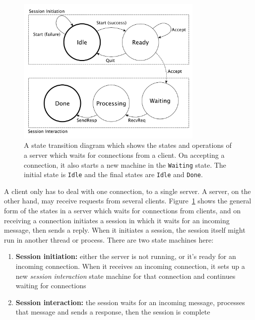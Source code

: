 \begin{figure}
\begin{center}
\includegraphics[width=9cm]{diagrams/randserver.pdf}
\end{center}
\caption{A state transition diagram which shows the states and
operations of a server which waits for connections from a client.
    On accepting a connection, it also starts a new machine in the \texttt{Waiting}
    state. The initial state is \texttt{Idle} and the final states are
    \texttt{Idle} and \texttt{Done}.}
\label{fig:randserver}
\end{figure}

A client only has to deal with one connection, to a single server. A server, on
the other hand, may receive requests from several clients. 
Figure~\ref{fig:randserver} shows the general form of the states in a server
which waits for connections from clients, and on receiving a connection
initiates a session in which it waits for an incoming message, then sends
a reply. When it initiates a session, the session itself might run in 
another thread or process. There are two state machines here:

\begin{enumerate}
\item \textbf{Session initiation:} either the server is not running, or it's ready
for an incoming connection. When it receives an incoming connection, it
sets up a new \emph{session interaction} state machine for that connection
and continues waiting for connections
\item \textbf{Session interaction:} the session waits for an incoming message,
processes that message and sends a response, then the session is complete
\end{enumerate}

